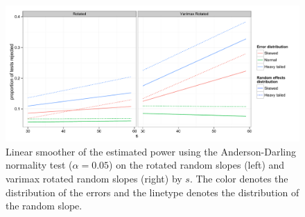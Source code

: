 \documentclass[12pt]{article} %
\begin{document}
\begin{figure}
	\centering
	\includegraphics[width=\textwidth]{ad_slope_power.pdf}
	\caption{\label{fig:power-slope}Linear smoother of the estimated power using the Anderson-Darling normality test ($\alpha = 0.05$) on the rotated random slopes (left) and varimax rotated random slopes (right) by $s$. The color denotes the distribution of the errors and the linetype denotes the distribution of the random slope.}
\end{figure}
\end{document}
